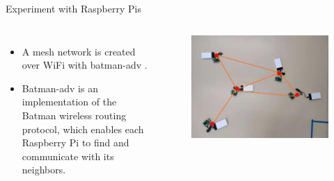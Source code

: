 \documentclass[10pt]{beamer}
\DeclareMathOperator{\1}{\textbf{1}}
\begin{document}
	      \begin{frame}{Experiment with Raspberry Pis}
		\begin{columns}[c]
		  \column{7cm}
		  \begin{itemize}
		    \item A mesh network is created over WiFi with batman-adv \cite{batman-adv}.
		    \item Batman-adv is an implementation of the Batman wireless routing protocol, which enables each Raspberry Pi to find and communicate with its neighbors.
		  \end{itemize}
		  \column{5cm}
		  \begin{figure}
		    \centering
		    \includegraphics[width=1\textwidth]{pic/rpi_expriment.png}
		  \end{figure}
		\end{columns}
	      \end{frame}
\end{document}
